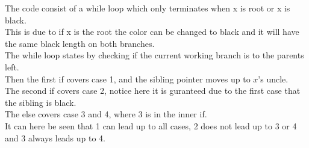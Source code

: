\documentclass[12pt, a4paper]{article}
\begin{document}
				The code consist of a while loop which only terminates when x is root or x is black.\\
				This is due to if x is the root the color can be changed to black and it will have the same black length on both branches.\\
				The while loop states by checking if the current working branch is to the parents left.\\
				Then the first if covers case 1, and the sibling pointer moves up to $x$'s uncle.\\
				The second if covers case 2, notice here it is guranteed due to the first case that the sibling is black.\\
				The else covers case 3 and 4, where 3 is in the inner if. \\
				It can here be seen that 1 can lead up to all cases, 2 does not lead up to 3 or 4 and 3 always leads up to 4.
				
					
				
					
					
						
				
			
				
	
				
\end{document}
